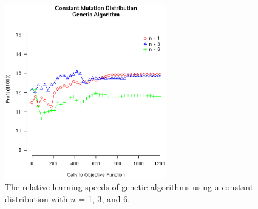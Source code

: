 \documentclass[12pt]{article}
\begin{document}
\begin{figure}[!ht]
\begin{minipage}[b]{0.5\linewidth}
    \includegraphics[width=7.0cm]{GenCONSTANTDist.eps}
    \caption{The relative learning speeds of genetic algorithms using a constant
      distribution with $n$ = 1, 3, and 6.}
  \end{minipage}
\end{figure}
\pagebreak
\end{document}
